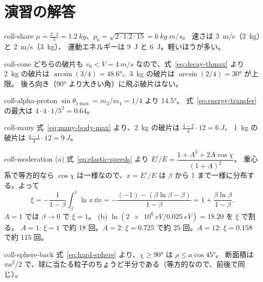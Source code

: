 \section{演習の解答}\label{sec:coll-solutions}

\begin{solution}{coll-share}
$\mu=\tfrac{2\cdot3}{5}=\qty{1.2}{kg}$、$p_0=\sqrt{2\cdot1.2\cdot15}=\qty{6}{kg.m/s}$。
速さは \qty{3}{m/s}（\qty{2}{kg}）と \qty{2}{m/s}（\qty{3}{kg}）、
運動エネルギーは \qty{9}{J} と \qty{6}{J}。軽いほうが多い。
\end{solution}

\begin{solution}{coll-cone}
どちらの破片も $v_0<V=\qty{4}{m/s}$ なので、式~\eqref{eq:decay-thmax} より
\qty{2}{kg} の破片は $\arcsin(3/4)=\ang{48.6}$、\qty{3}{kg} の破片は $\arcsin(2/4)=\ang{30}$ が上限。
後ろ向き（\ang{90} より大きい角）に飛ぶ破片はない。
\end{solution}

\begin{solution}{coll-alpha-proton}
$\sin\theta_{1\max}=m_2/m_1=1/4$ より \ang{14.5}。
式~\eqref{eq:energy-transfer} の最大は $4\cdot4\cdot1/5^2=0.64$。
\end{solution}

\begin{solution}{coll-many}
式~\eqref{eq:many-body-max} より、\qty{2}{kg} の破片は $\tfrac{4-2}{4}\cdot12=\qty{6}{J}$、
\qty{1}{kg} の破片は $\tfrac{4-1}{4}\cdot12=\qty{9}{J}$。
\end{solution}

\begin{solution}{coll-moderation}
(a) 式~\eqref{eq:elastic-speeds} より $E'/E=\dfrac{1+A^2+2A\cos\chi}{(1+A)^2}$。
重心系で等方的なら $\cos\chi$ は一様なので、$x=E'/E$ は $\beta$ から 1 まで一様に分布する。よって
\begin{equation*}
  \xi=-\frac{1}{1-\beta}\int_\beta^1\ln x\,\dd x
  =-\frac{(-1)-(\beta\ln\beta-\beta)}{1-\beta}=1+\frac{\beta\ln\beta}{1-\beta}.
\end{equation*}
$A=1$ では $\beta\to0$ で $\xi=1$。
(b) $\ln(\qty{2e6}{eV}/\qty{0.025}{eV})=18.20$ を $\xi$ で割る。
$A=1$: $\xi=1$ で約 18 回。$A=2$: $\xi=0.725$ で約 25 回。$A=12$: $\xi=0.158$ で約 115 回。
\end{solution}

\begin{solution}{coll-sphere-back}
式~\eqref{eq:hard-sphere} より、$\chi\ge\ang{90}$ は $\rho\le a\cos\ang{45}$。
断面積は $\pi a^2/2$ で、球に当たる粒子のちょうど半分である（等方的なので、前後で同じ）。
\end{solution}

